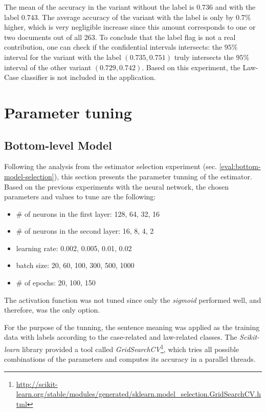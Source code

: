 \documentclass[
  digital, %
  notable,   %
  nolof,     %
  nolot,     %
]{fithesis3}
\begin{document}
The mean of the accuracy in the variant without the label is $0.736$ and with the label $0.743$.
The average accuracy of the variant with the label is only by $0.7\%$ higher, which is very negligible increase since this amount corresponds to one or two documents out of all 263. 
To conclude that the label flag is not a real contribution, one can check if the confidential intervals intersects: the $95\%$ interval for the variant with the label $(0.735, 0.751)$ truly intersects the $95\%$ interval of the other variant $(0.729, 0.742)$.
Based on this experiment, the Law-Case classifier is not included in the application.



\section{Parameter tuning}
\subsection{Bottom-level Model}
\label{eval:bottom-model-tuning}
Following the analysis from the estimator selection experiment (sec. \ref{eval:bottom-model-selection}), this section presents the parameter tunning of the estimator.
Based on the previous experiments with the neural network, the chosen parameters and values to tune are the following:
\begin{itemize}
\item \# of neurons in the first layer: 128, 64, 32, 16
\item \# of neurons in the second layer: 16, 8, 4, 2
\item learning rate: 0.002, 0.005, 0.01, 0.02
\item batch size: 20, 60, 100, 300, 500, 1000
\item \# of epochs: 20, 100, 150
\end{itemize}
The activation function was not tuned since only the \textit{sigmoid} performed well, and therefore, was the only option.

For the purpose of the tunning, the sentence meaning was applied as the training data with labels according to the case-related and law-related classes.
The \textit{Scikit-learn} library provided a tool called \textit{GridSearchCV}\footnote{\url{http://scikit-learn.org/stable/modules/generated/sklearn.model_selection.GridSearchCV.html}}, which tries all possible combinations of the parameters and computes its accuracy in a parallel threads.
\end{document}
